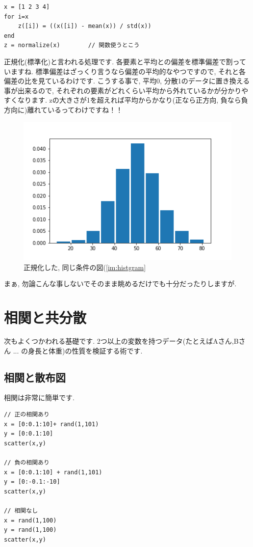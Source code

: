 \documentclass[11pt,a4paper,uplatex]{ujreport}
\begin{document}
\begin{lstlisting}[caption=式(\ref{eq:normalize})のコード,label=sc:normalize,  keepspaces=true]
x = [1 2 3 4]
for i=x
    z([i]) = ((x([i]) - mean(x)) / std(x))
end
z = normalize(x)        // 関数使うとこう
\end{lstlisting}



正規化(標準化)と言われる処理です. 各要素と平均との偏差を標準偏差で割っていますね. 標準偏差はざっくり言うなら偏差の平均的なやつですので, それと各偏差の比を見ているわけです. こうする事で, 平均0, 分散1のデータに置き換える事が出来るので, それぞれの要素がどれくらい平均から外れているかが分かりやすくなります. zの大きさが1を超えれば平均からかなり(正なら正方向, 負なら負方向に)離れているってわけですね！！\\

\begin{figure}[H]
\label{im:z-hist}
  \centering
  \includegraphics[width=120mm,bb=0 0 432 288]{../figures/z-hist.png}
  \caption{正規化した, 同じ条件の図(\ref{im:histgram}}
\end{figure}

まぁ, 勿論こんな事しないでそのまま眺めるだけでも十分だったりしますが.

\section{相関と共分散}
次もよくつかわれる基礎です. 2つ以上の変数を持つデータ(たとえばAさん,Bさん ... の身長と体重)の性質を検証する術です. \\
\subsection{相関と散布図}
相関は非常に簡単です. 
\begin{lstlisting}[caption=図(\ref{im:scatter1}\ref{im:scatter2})のコード,label=sc:scatter]
// 正の相関あり
x = [0:0.1:10]+ rand(1,101)
y = [0:0.1:10]
scatter(x,y)

// 負の相関あり
x = [0:0.1:10] + rand(1,101)
y = [0:-0.1:-10]
scatter(x,y)

// 相関なし
x = rand(1,100)
y = rand(1,100)
scatter(x,y)
\end{lstlisting}
\end{document}
